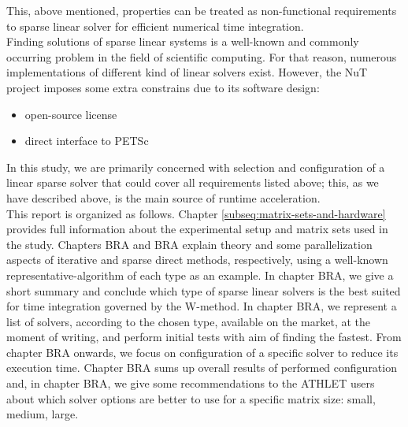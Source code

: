 This, above mentioned, properties can be treated as non-functional requirements to sparse linear solver for efficient numerical time integration.\\

 
Finding solutions of sparse linear systems is a well-known and commonly occurring problem in the field of scientific computing. For that reason, numerous implementations of different kind of linear solvers exist. However, the NuT project imposes some extra constrains due to its software design: \\


\begin{itemize}
	\item open-source license
	\item direct interface to PETSc
\end{itemize}



In this study, we are primarily concerned with selection and configuration of a linear sparse solver that could cover all requirements listed above; this, as we have described above, is the main source of runtime acceleration.\\


This report is organized as follows. Chapter \ref{subseq:matrix-sets-and-hardware} provides full information about the experimental setup and matrix sets  used in the study. Chapters BRA and BRA explain theory and some parallelization aspects of iterative and sparse direct methods, respectively, using a  well-known representative-algorithm of each type as an example. In chapter BRA, we give a short summary and conclude which type of sparse linear solvers is the best suited for time integration governed by the W-method. In chapter BRA, we represent a list of solvers, according to the chosen type, available on the market, at the moment of writing, and perform initial tests with aim of finding the fastest. From chapter BRA onwards, we focus on configuration of a specific solver to reduce its execution time. Chapter BRA sums up overall results of performed configuration and, in chapter BRA, we give some recommendations to the ATHLET users about which solver options are better to use for a specific matrix size: small, medium, large.\\










